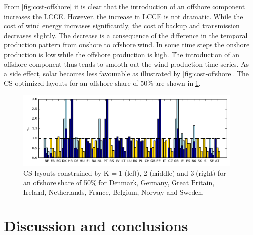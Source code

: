 \documentclass[a4paper, 5p, sort&compress]{elsarticle}%
\begin{document}
From \cref{fig:cost-offshore} it is clear that the introduction of an
offshore component increases the LCOE. However, the increase in LCOE
is not dramatic. While the cost of wind energy increases
significantly, the cost of backup and transmission decreases
slightly. The decrease is a consequence of the difference in the
temporal production pattern from onshore to offshore wind. In some
time steps the onshore production is low while the offshore production
is high. The introduction of an offshore component thus tends to
smooth out the wind production time series. As a side effect, solar
becomes less favourable as illustrated by
\cref{fig:cost-offshore}. The CS optimized layouts for an offshore
share of 50\% are shown in \cref{fig:layout-offshore}.

\begin{figure}[p]
  \centering
  \includegraphics[width = 2\columnwidth, center]{offshoreLayouts}
  \caption{CS layouts constrained by K = 1 (left), 2 (middle) and 3
    (right) for an offshore share of 50\% for Denmark, Germany, Great
    Britain, Ireland, Netherlands, France, Belgium, Norway and
    Sweden.}
  \label{fig:layout-offshore}
\end{figure}

\section{Discussion and conclusions}
\label{sec:four}
\end{document}
